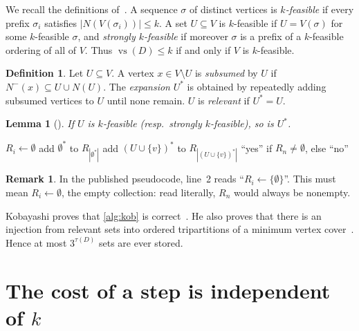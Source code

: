 \documentclass[11pt]{article}
\newtheorem{lemma}[theorem]{Lemma}
\theoremstyle{definition}
\newtheorem{definition}[theorem]{Definition}
\newtheorem{remark}[theorem]{Remark}
\newcommand{\Nm}{N^{-}}
\newcommand{\vs}{\operatorname{vs}}
\newcommand{\set}[1]{\{#1\}}
\begin{document}
We recall the definitions of~\cite{Kob15}. A sequence $\sigma$ of distinct
vertices is \emph{$k$-feasible} if every prefix $\sigma_i$ satisfies
$|N(V(\sigma_i))|\le k$. A set $U\subseteq V$ is $k$-feasible if
$U=V(\sigma)$ for some $k$-feasible $\sigma$, and \emph{strongly
$k$-feasible} if moreover $\sigma$ is a prefix of a $k$-feasible ordering of
all of $V$. Thus $\vs(D)\le k$ if and only if $V$ is $k$-feasible.

\begin{definition}
Let $U\subseteq V$. A vertex $x\in V\setminus U$ is \emph{subsumed} by $U$
if $\Nm(x)\subseteq U\cup N(U)$. The \emph{expansion} $U^{*}$ is obtained by
repeatedly adding subsumed vertices to $U$ until none remain. $U$ is
\emph{relevant} if $U^{*}=U$.
\end{definition}

\begin{lemma}[{\cite[Lemma~1]{Kob15}}]\label{lem:kob1}
If $U$ is $k$-feasible (resp.\ strongly $k$-feasible), so is $U^*$.
\end{lemma}

\begin{algorithm}[t]
\caption{Kobayashi's decision procedure~\cite[Algorithm~1]{Kob15}.}\label{alg:kob}
\begin{algorithmic}[1]
 $R_i\gets\emptyset$ \EndFor
\State add $\emptyset^{*}$ to $R_{|\emptyset^{*}|}$
    \ForAll{$v\in V\setminus U$ with $|N(U\cup\set{v})|\le k$}
      \State add $(U\cup\set v)^{*}$ to $R_{|(U\cup\set v)^*|}$
    \EndFor
  \EndFor
\EndFor
\State \Return ``yes'' if $R_n\ne\emptyset$, else ``no''
\end{algorithmic}
\end{algorithm}

\begin{remark}
In the published pseudocode, line~2 reads ``$R_i\gets\{\emptyset\}$''.
This must mean $R_i\gets\emptyset$, the empty collection: read literally,
$R_n$ would always be nonempty.
\end{remark}

Kobayashi proves that \cref{alg:kob} is correct~\cite[Lemma~2]{Kob15}. He
also proves that there is an injection from relevant sets into ordered
tripartitions of a minimum vertex cover~\cite[Lemma~3]{Kob15}. Hence at most
$3^{\tau(D)}$ sets are ever stored.

\section{The cost of a step is independent of \texorpdfstring{$k$}{k}}\label{sec:mono}
\end{document}
